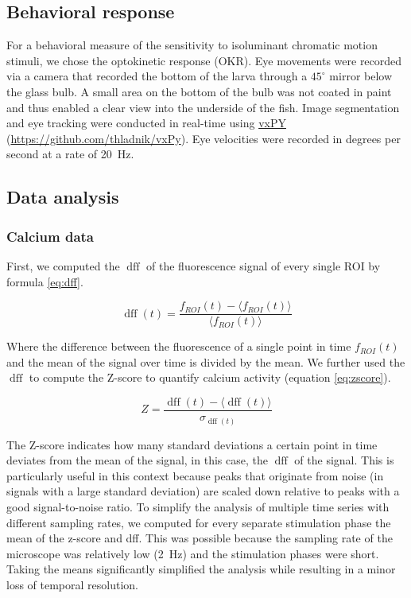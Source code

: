 \subsection{Behavioral response}

For a behavioral measure of the sensitivity to isoluminant chromatic motion stimuli, we chose the optokinetic response (OKR). 
Eye movements were recorded via a camera that recorded the bottom of the larva through a $45^\circ$ mirror below the glass bulb. A small area on the bottom of the bulb was not coated in paint and thus enabled a clear view into the underside of the fish. Image segmentation and eye tracking were conducted in real-time using \href{https://github.com/thladnik/vxPy}{vxPY} (\href{https://github.com/thladnik/vxPy}{https://github.com/thladnik/vxPy}). Eye velocities were recorded in degrees per second at a rate of \SI{20}{\hertz}.  

\subsection{Data analysis}

\subsubsection{Calcium data}

First, we computed the $\operatorname{dff}$ of the fluorescence signal of every single ROI by formula \ref{eq:dff}.

\begin{equation}
    \operatorname{dff}(t) = \frac{f_{ROI}(t) - \langle f_{ROI}(t) \rangle}{\langle f_{ROI}(t) \rangle}
    \label{eq:dff}
\end{equation}

Where the difference between the fluorescence of a single point in time $f_{ROI}(t)$ and the mean of the signal over time is divided by the mean. We further used the $\operatorname{dff}$ to compute the Z-score to quantify calcium activity (equation \ref{eq:zscore}).

\begin{equation}
    Z = \frac{\operatorname{dff}(t) - \langle \operatorname{dff}(t) \rangle}{\sigma_{\operatorname{dff}(t)}}
    \label{eq:zscore}
\end{equation}

The Z-score indicates how many standard deviations a certain point in time deviates from the mean of the signal, in this case, the $\operatorname{dff}$ of the signal. This is particularly useful in this context because peaks that originate from noise (in signals with a large standard deviation) are scaled down relative to peaks with a good signal-to-noise ratio. To simplify the analysis of multiple time series with different sampling rates, we computed for every separate stimulation phase the mean of the z-score and dff. This was possible because the sampling rate of the microscope was relatively low (\SI{2}{\hertz}) and the stimulation phases were short. Taking the means significantly simplified the analysis while resulting in a minor loss of temporal resolution.

